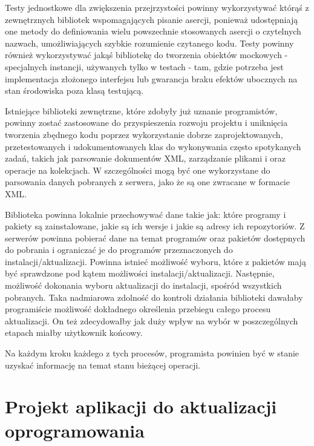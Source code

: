\documentclass[polish,12pt,titlepage]{article}
\begin{document}
Testy jednostkowe dla zwiększenia przejrzystości powinny wykorzystywać
którąś z zewnętrznych bibliotek wspomagających pisanie asercji, ponieważ
udostępniają one metody do definiowania wielu powszechnie stosowanych asercji
o czytelnych nazwach, umożliwiających szybkie rozumienie czytanego kodu.
Testy powinny również wykorzystywać jakąś bibliotekę do tworzenia obiektów
mockowych - specjalnych instancji, używanych tylko w testach - tam, gdzie 
potrzeba jest implementacja złożonego interfejsu lub gwarancja braku efektów 
ubocznych na stan środowiska poza klasą testującą.

Istniejące biblioteki zewnętrzne, które zdobyły już uznanie programistów,
powinny zostać zastosowane do przyspieszenia rozwoju projektu i uniknięcia
tworzenia zbędnego kodu poprzez wykorzystanie dobrze zaprojektowanych,
przetestowanych i udokumentowanych klas do wykonywania często spotykanych
zadań, takich jak parsowanie dokumentów XML, zarządzanie plikami i oraz
operacje na kolekcjach. W szczególności mogą być one wykorzystane do
parsowania danych pobranych z serwera, jako że są one zwracane w formacie
XML.

Biblioteka powinna lokalnie przechowywać dane takie jak: które programy
i pakiety są zainstalowane, jakie są ich wersje i jakie są adresy ich
repozytoriów. Z serwerów powinna pobierać dane na temat programów oraz
pakietów dostępnych do pobrania i ograniczać je do programów przeznaczonych
do instalacji/aktualizacji. Powinna istnieć możliwość wyboru, które
z pakietów mają być sprawdzone pod kątem możliwości instalacji/aktualizacji.
Następnie, możliwość dokonania wyboru aktualizacji do instalacji, spośród
wszystkich pobranych. Taka nadmiarowa zdolność do kontroli działania
biblioteki dawałaby programiście możliwość dokładnego określenia przebiegu
całego procesu aktualizacji. On też zdecydowałby jak duży wpływ na wybór w
poszczególnych etapach miałby użytkownik końcowy.

Na każdym kroku każdego z tych procesów, programista powinien być w stanie
uzyskać informację na temat stanu bieżącej operacji.

\newpage


\section{Projekt aplikacji do aktualizacji oprogramowania}
\end{document}
